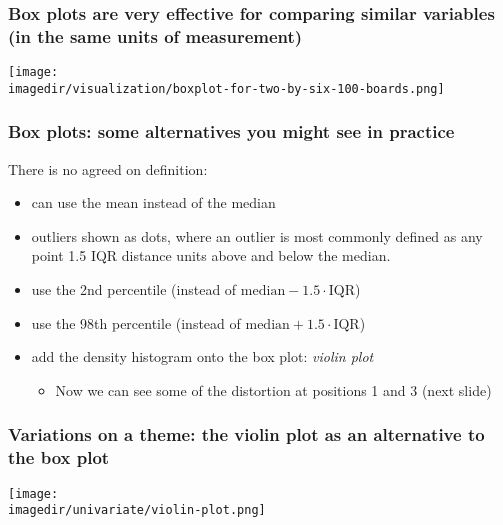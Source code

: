 \begin{frame}\frametitle{Box plots are very effective for comparing similar variables (in the same units of measurement)}
	\begin{center}
		\texttt{[image: \\imagedir/visualization/boxplot-for-two-by-six-100-boards.png]}
	\end{center}
\end{frame}

\begin{frame}\frametitle{Box plots: some alternatives you might see in practice}
	
	There is no agreed on definition:
	\begin{itemize}
		\item	can use the mean instead of the median 
		\item	outliers shown as dots, where an outlier is most commonly defined as any point 1.5 IQR distance units above and below the median. 
		\item	use the 2nd percentile (instead of $\text{median} - 1.5\cdot\text{IQR}$) 
		\item	use the 98th percentile (instead of $\text{median} + 1.5\cdot\text{IQR}$) 
		\item	add the density histogram onto the box plot: \emph{violin plot} 
		\begin{itemize}
			\item	Now we can see some of the distortion at positions 1 and 3 (next slide)
		\end{itemize}
	\end{itemize}
\end{frame}

\begin{frame}\frametitle{Variations on a theme: the violin plot as an alternative to the box plot}
	
	\vspace{-5pt}
	\centerline{\texttt{[image: \\imagedir/univariate/violin-plot.png]}}
\end{frame}

